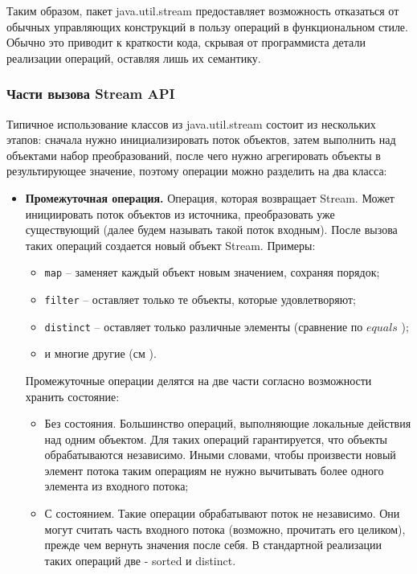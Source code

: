 Таким образом, пакет java.util.stream предоставляет возможность отказаться от обычных управляющих конструкций в пользу операций в функциональном стиле. Обычно это приводит к краткости кода, скрывая от программиста детали реализации операций, оставляя лишь их семантику.

\subsubsection{Части вызова Stream API}
Типичное использование классов из java.util.stream состоит из нескольких этапов: сначала 
нужно инициализировать поток объектов, затем выполнить над объектами набор преобразований, 
после чего нужно агрегировать объекты в результирующее значение, поэтому операции 
можно разделить на два класса:
\begin{itemize}
	\item \textbf{Промежуточная операция.} Операция, которая возвращает Stream. Может инициировать поток объектов из источника, преобразовать уже существующий (далее будем называть такой поток входным). После вызова таких операций создается новый объект Stream. Примеры:
	\begin{itemize}
		\item \texttt{map} -- заменяет каждый объект новым значением, сохраняя порядок;
		\item \texttt{filter} -- оставляет только те объекты, которые удовлетворяют;
		\item \texttt{distinct} -- оставляет только различные элементы (сравнение по $equals$ \cite{java:equals});
		\item и многие другие (см \cite{java:stream}).
	\end{itemize}
	Промежуточные операции делятся на две части согласно возможности хранить состояние:
	\begin{itemize}
		\item Без состояния. Большинство операций, выполняющие локальные действия над одним 
		объектом. Для таких операций гарантируется, что объекты обрабатываются независимо. Иными словами, чтобы произвести новый элемент потока таким операциям не нужно вычитывать более одного элемента из входного потока;
		\item С состоянием. Такие операции обрабатывают поток не независимо. Они могут считать часть входного потока (возможно, прочитать его целиком), прежде чем вернуть значения после себя. В стандартной реализации таких операций две - sorted и distinct.
	\end{itemize}

\end{itemize}
